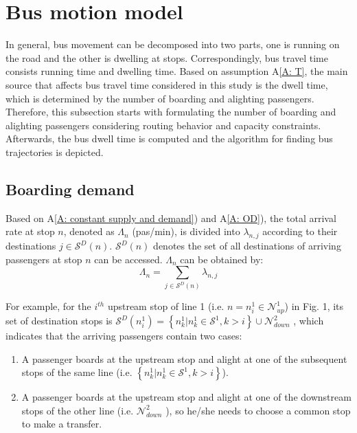 \documentclass[smallextended]{svjour3}       %
\begin{document}
\begin{Abstract}
\begin{table}[H]
\begin{tabular}{p{1.5cm}p{7cm}p{1.1cm}}
\end{tabular}
\end{table}

\section{Bus motion model}\label{Bus movement}
In general, bus movement can be decomposed into two parts, one is running on the road and the other is dwelling at stops. Correspondingly, bus travel time consists running time and dwelling time.
Based on assumption A\ref{A: T}, the main source that affects bus travel time considered in this study is the dwell time, which is determined by the number of boarding and alighting passengers. 
Therefore, this subsection starts with formulating the number of boarding and alighting passengers considering routing behavior and capacity constraints. Afterwards, the bus dwell time is computed and the algorithm for finding bus trajectories is depicted.

\subsection{Boarding demand}\label{B}
Based on A\ref{A: constant supply and demand}) and A\ref{A: OD}), 
the total arrival rate at stop $n$, denoted as $\Lambda_{n}$ (pas/min), 
is divided into $\lambda_{n,j}$ 
according to their destinations $j\in \mathcal{S}^{D}(n)$.
$\mathcal{S}^{D}\left( n \right)$ denotes the set of all destinations of arriving passengers 
at stop $n$ can be accessed. $\Lambda_{n}$ can be obtained by:
\begin{equation}
    \label{equ:sumLambda}
    \Lambda_{n} = \sum_{j \in \mathcal{S}^{D}\left( n \right)} \lambda_{n,j} 
\end{equation}

For example, for the $i^{th}$ upstream stop of line 1
(i.e. $n=n^{1}_{i} \in \mathcal{N}_{up}^{1}$) in \textup{Fig. 1}, 
its set of destination stops is 
$\mathcal{S}^{D}\left( n^{1}_{i} \right) = 
\left\{ n^{1}_{k}|n^{1}_{k} \in \mathcal{S}^{1},k > i \right\}
\cup \mathcal{N}_{down}^{2}$ , 
which indicates that the arriving passengers contain two cases:
\begin{enumerate}[1)]
    \item A passenger boards at the upstream stop and alight 
    at one of the subsequent stops of the same line 
    (i.e. $\left\{ n^{1}_{k}|n^{1}_{k} \in \mathcal{S}^{1},k > i \right\}$).
    \item A passenger boards at the upstream stop and alight at one of the downstream stops of the other line 
    (i.e. $\mathcal{N}_{down}^{2}$ ), 
    so he/she needs to choose a common stop to make a transfer.
\end{enumerate}


\end{Abstract}
\end{document}
